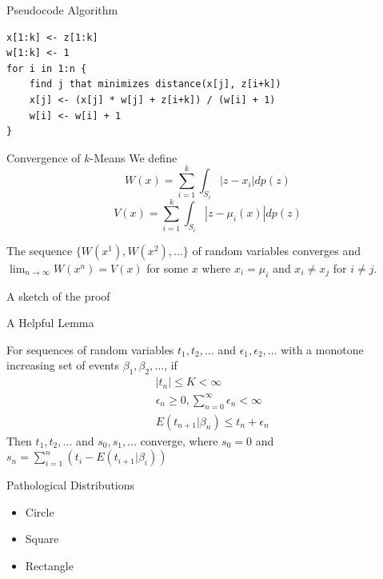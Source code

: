 \documentclass[12pt]{beamer}
\begin{document}
\begin{frame}[fragile]{Pseudocode Algorithm}
\vfill
\begin{small}
\begin{lstlisting}
x[1:k] <- z[1:k]
w[1:k] <- 1
for i in 1:n {
    find j that minimizes distance(x[j], z[i+k])
    x[j] <- (x[j] * w[j] + z[i+k]) / (w[i] + 1)
    w[i] <- w[i] + 1
}
\end{lstlisting}
\end{small}
\vfill
\end{frame}

\begin{frame}{Convergence of $k$-Means}
\vfill
We define
\[ W(x) = \sum_{i=1}^k \int_{S_i} |z-x_i| dp(z) \]
\[ V(x) = \sum_{i=1}^k \int_{S_i} |z-\mu_i(x)| dp(z) \]
\vfill
\begin{theorem}
	The sequence $\{ W(x^1), W(x^2), ...\}$ of random variables converges
	and $\lim_{n \to \infty} W(x^n) = V(x)$ for some $x$ where $x_i = \mu_i$
	and $x_i \neq x_j$ for $i \neq j$.
\end{theorem}
\vfill
A sketch of the proof
\vfill
\end{frame}

\begin{frame}{A Helpful Lemma}
\vfill
\begin{lemma}
	For sequences of random variables $t_1, t_2, \ldots$ and 
	$\epsilon_1, \epsilon_2, \ldots$ with a monotone increasing set of
	events $ \beta_1, \beta_2, \ldots $, if
	\begin{align*}
		&|t_n| \leq K < \infty \\
		&\epsilon_n \geq 0, \sum_{n=0}^{\infty} \epsilon_n < \infty \\
		&E(t_{n+1} | \beta_n) \leq t_n + \epsilon_n
	\end{align*}
	Then $t_1, t_2, \ldots$ and $s_0, s_1, \ldots$ converge, where
	$s_0 = 0$ and $s_n = \sum_{i=1}^n (t_i - E(t_{i+1} | \beta_i))$
\end{lemma}
\vfill
\end{frame}

\begin{frame}{Pathological Distributions}
\begin{itemize}
	\vfill
	\item Circle
	\vfill
	\item Square
	\vfill
	\item Rectangle
	\vfill
\end{itemize}
\end{frame}
\end{document}
